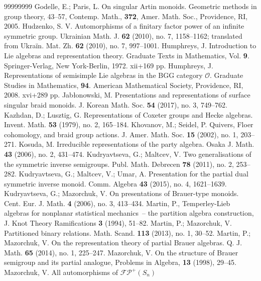 \documentclass[a4paper]{amsart}
\begin{document}
\begin{thebibliography}{99999999}
 Godelle, E.; Paris, L. On singular Artin monoids. 
Geometric methods in group theory, 43--57, Contemp. Math., {\bf 372}, 
Amer. Math. Soc., Providence, RI, 2005.
 Hudzenko, S. V. Automorphisms of a finitary factor power 
of an infinite symmetric group. Ukrainian Math. J. {\bf 62} (2010), no. 7, 1158--1162; 
translated from Ukraïn. Mat. Zh. {\bf 62} (2010), no. 7, 997--1001.
 Humphreys, J. Introduction to Lie algebras and 
representation theory. Graduate Texts in Mathematics, Vol. {\bf 9}. 
Springer-Verlag, New York-Berlin, 1972. xii+169 pp.
 Humphreys, J. Representations of semisimple Lie 
algebras in the BGG category $\mathcal{O}$. Graduate Studies in 
Mathematics, {\bf 94}. American Mathematical Society, 
Providence, RI, 2008. xvi+289 pp. 
 Jab{\l}onowski, M. Presentations and representations 
of surface singular braid monoids. J. Korean Math. Soc. {\bf 54} 
(2017), no. 3, 749--762.
 Kazhdan, D.; Lusztig, G. Representations of Coxeter 
groups and Hecke algebras. Invent. Math. {\bf 53} (1979), no. 2, 165--184.
 Khovanov, M.; Seidel, P. Quivers, Floer cohomology, 
and braid group actions. J. Amer. Math. Soc. {\bf 15} (2002), no. 1, 203--271. 
 Kosuda, M. Irreducible representations of the party algebra. 
Osaka J. Math. {\bf 43} (2006), no. 2, 431--474. 
 Kudryavtseva, G.; Maltcev, V. Two generalisations of 
the symmetric inverse semigroups. Publ. Math. Debrecen {\bf 78} 
(2011), no. 2, 253--282.
 Kudryavtseva, G.; Maltcev, V.; Umar, A. 
Presentation for the partial dual symmetric inverse monoid. 
Comm. Algebra {\bf 43} (2015), no. 4, 1621--1639.
 Kudryavtseva, G.; Mazorchuk, V. On presentations of 
Brauer-type monoids. Cent. Eur. J. Math. {\bf 4} (2006), no. 3, 413--434.
 Martin, P., Temperley-Lieb algebras for nonplanar 
statistical mechanics~-- the partition algebra construction, J. 
Knot Theory Ramifications {\bf 3} (1994), 51--82. 
 Martin, P.; Mazorchuk, V. Partitioned binary relations. 
Math. Scand. {\bf 113} (2013), no. 1, 30--52. 
 Martin, P.; Mazorchuk, V. On the representation theory 
of partial Brauer algebras. Q. J. Math. {\bf 65} (2014), no. 1, 225--247.
 Mazorchuk, V. On the structure of Brauer semigroup 
and its partial analogue, Problems in Algebra, {\bf 13} (1998), 29--45.
 Mazorchuk, V. All automorphisms of $\mathcal{FP}^+(S_n)$ 

\end{thebibliography}
\end{document}
